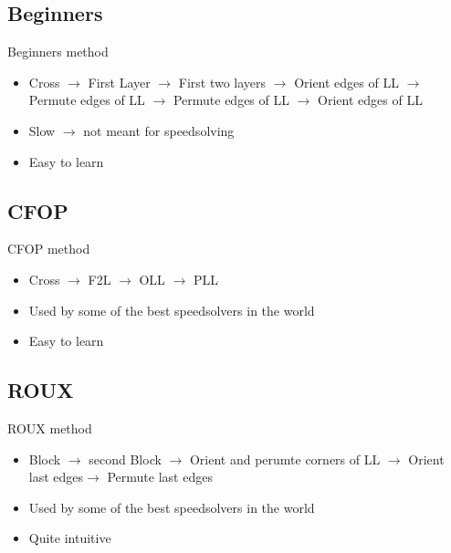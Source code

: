 \documentclass{beamer}
\begin{document}
        \subsection{Beginners}
            \begin{frame}{Beginners method}
                \begin{itemize}
                    \item Cross $\rightarrow{}$ First Layer $\rightarrow{}$ First two layers $\rightarrow{}$ Orient edges of LL $\rightarrow{}$ Permute edges of LL $\rightarrow{}$ Permute edges of LL $\rightarrow{}$ Orient edges of LL \pause{} 
                    \item Slow $\rightarrow{}$ not meant for speedsolving \pause{}
                    \item Easy to learn
                \end{itemize}
            \end{frame}
        \subsection{CFOP}
            \begin{frame}{CFOP method}
                \begin{itemize}
                    \item Cross $\rightarrow{}$ F2L $\rightarrow{}$ OLL $\rightarrow{}$ PLL \pause{} 
                    \item Used by some of the best speedsolvers in the world \pause{}
                    \item Easy to learn
                \end{itemize}
            \end{frame}
        \subsection{ROUX}
        \begin{frame}{ROUX method}
                \begin{itemize}
                    \item Block $\rightarrow{}$ second Block $\rightarrow{}$ Orient and perumte corners of LL $\rightarrow{}$ Orient last edges$\rightarrow{}$ Permute last edges \pause{} 
                    \item Used by some of the best speedsolvers in the world \pause{}
                    \item Quite intuitive
                \end{itemize}
            \end{frame}
\end{document}
